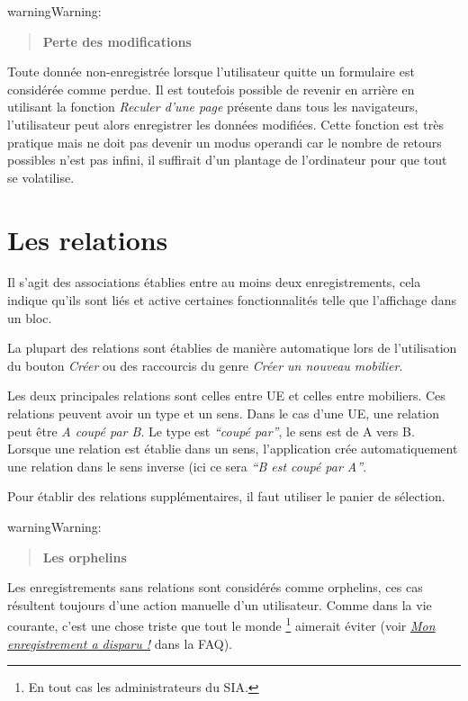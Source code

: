 \documentclass[letterpaper,10pt,french]{sphinxmanual}
\begin{document}
\begin{notice}{warning}{Warning:}\begin{quote}

\textbf{Perte des modifications}
\end{quote}

Toute donnée non-enregistrée lorsque l'utilisateur quitte un formulaire est considérée comme perdue. Il est toutefois possible de revenir en arrière en utilisant la fonction \emph{Reculer d'une page} présente dans tous les navigateurs, l'utilisateur peut alors enregistrer les données modifiées. Cette fonction est très pratique mais ne doit pas devenir un modus operandi car le nombre de retours possibles n'est pas infini, il suffirait d'un plantage de l'ordinateur pour que tout se volatilise.
\end{notice}


\section{Les relations}
\label{manuel/interface:les-relations}
Il s'agit des associations établies entre au moins deux enregistrements, cela indique qu'ils sont liés et active certaines fonctionnalités telle que l'affichage dans un bloc.

La plupart des relations sont établies de manière automatique lors de l'utilisation du bouton \emph{Créer} ou des raccourcis du genre \emph{Créer un nouveau mobilier}.

Les deux principales relations sont celles entre UE et celles entre mobiliers. Ces relations peuvent avoir un type et un sens. Dans le cas d'une UE, une relation peut être \emph{A coupé par B}. Le type est \emph{``coupé par''}, le sens est de A vers B. Lorsque une relation est établie dans un sens, l'application crée automatiquement une relation dans le sens inverse (ici ce sera \emph{``B est coupé par A''}.

Pour établir des relations supplémentaires, il faut utiliser le panier de sélection.

\begin{notice}{warning}{Warning:}\begin{quote}

\textbf{Les orphelins}
\end{quote}

Les enregistrements sans relations sont considérés comme orphelins, ces cas résultent toujours d'une action manuelle d'un utilisateur. Comme dans la vie courante, c'est une chose triste que tout le monde \footnote{
En tout cas les administrateurs du SIA.
} aimerait éviter (voir {\hyperref[manuel/questions_frequentes:def-valeurs-perdues]{\emph{Mon enregistrement a disparu !}}} dans la FAQ).
\end{notice}
\end{document}
